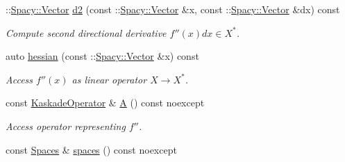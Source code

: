 \begin{DoxyCompactItemize}
\-::\hyperlink{classSpacy_1_1Vector}{Spacy\-::\-Vector} \hyperlink{classSpacy_1_1Kaskade_1_1C2Functional_a7bd6c110c1f954a92f43f6035787a9f0}{d2} (const \-::\hyperlink{classSpacy_1_1Vector}{Spacy\-::\-Vector} \&x, const \-::\hyperlink{classSpacy_1_1Vector}{Spacy\-::\-Vector} \&dx) const 
\begin{DoxyCompactList}\small\item\em Compute second directional derivative $f''(x)dx\in X^* $. \end{DoxyCompactList}\item 
auto \hyperlink{classSpacy_1_1Kaskade_1_1C2Functional_a73e0b9a2499e89bf85eddf1aa74fe9ba}{hessian} (const \-::\hyperlink{classSpacy_1_1Vector}{Spacy\-::\-Vector} \&x) const 
\begin{DoxyCompactList}\small\item\em Access $f''(x)$ as linear operator $X\rightarrow X^*$. \end{DoxyCompactList}\item 
\hypertarget{classSpacy_1_1Kaskade_1_1C2Functional_ab45aa1c81e4698b642a5381a9b6be14b}{const \hyperlink{classSpacy_1_1Kaskade_1_1C2Functional_af530f936729e854d2fd1401526149ba1}{Kaskade\-Operator} \& \hyperlink{classSpacy_1_1Kaskade_1_1C2Functional_ab45aa1c81e4698b642a5381a9b6be14b}{A} () const noexcept}\label{classSpacy_1_1Kaskade_1_1C2Functional_ab45aa1c81e4698b642a5381a9b6be14b}

\begin{DoxyCompactList}\small\item\em Access operator representing $f''$. \end{DoxyCompactList}\item 
\hypertarget{classSpacy_1_1Kaskade_1_1C2Functional_ac334455723ea59d001fef33e056b1ea7}{const \hyperlink{classSpacy_1_1Kaskade_1_1C2Functional_afb866208161b4421f74aab07f50af065}{Spaces} \& \hyperlink{classSpacy_1_1Kaskade_1_1C2Functional_ac334455723ea59d001fef33e056b1ea7}{spaces} () const noexcept}\label{classSpacy_1_1Kaskade_1_1C2Functional_ac334455723ea59d001fef33e056b1ea7}


\end{DoxyCompactItemize}

